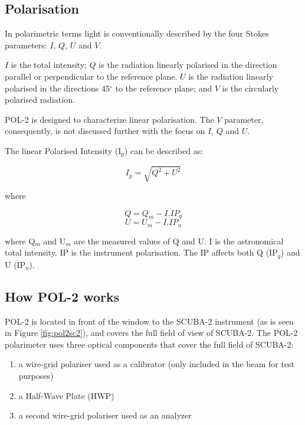 \subsection*{Polarisation}

In polarimetric terms light is conventionally described by the four
Stokes parameters: $I$, $Q$, $U$ and $V$.


$I$ is the total intensity; $Q$ is the radiation linearly polarised in
the direction parallel or perpendicular to the reference plane. $U$ is
the radiation linearly polarised in the directions 45$^{\circ }$ to
the reference plane; and $V$ is the circularly polarised radiation.

POL-2 is designed to characterize linear polarisation.  The $V$
parameter, consequently, is not discussed further with the focus on $I$,
$Q$ and $U$.

The linear Polarised Intensity (I$_{p}$) can be described as:

\begin{equation}
I_{p} = \sqrt{Q^{2}+U^{2}}
\end{equation}

where

\begin{equation}
Q = Q_{m} - I . IP_{q}
\end{equation}
\begin{equation}
U = U_{m} - I . IP_{u}
\end{equation}

where Q$_{m}$ and U$_{m}$ are the measured values of Q and U.  I is
the astronomical total intensity.  IP is the instrument
polarisation. The IP affects both Q (IP$_{q}$) and U (IP$_{u}$).


\subsection*{How POL-2 works}

POL-2 is located in front of the window to the SCUBA-2 instrument (as
is seen in Figure \ref{fig:pol2sc2}), and covers the full field of
view of SCUBA-2. The POL-2 polarimeter uses three optical components
that cover the full field of SCUBA-2:

\begin{enumerate}
\item a wire-grid polariser used as a calibrator (only included in the
  beam for test purposes)
\item a Half-Wave Plate (HWP)
\item a second wire-grid polariser used as an analyzer
\end{enumerate}


